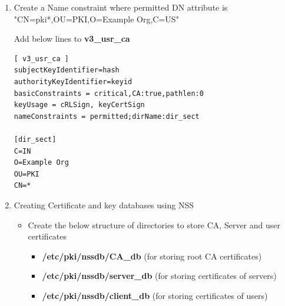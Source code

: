 \documentclass[a4paper]{article}
\begin{document}
\begin{enumerate}[label*=\arabic*.]
\begin{lstlisting}
[alt_names]
DNS.1 = *.example.org
       \end{lstlisting}

    \item Create a Name constraint where permitted DN attribute is "CN=pki*,OU=PKI,O=Example Org,C=US"

            Add below lines to \textbf{v3\_usr\_ca} 
            \begin{lstlisting}
[ v3_usr_ca ]
subjectKeyIdentifier=hash
authorityKeyIdentifier=keyid
basicConstraints = critical,CA:true,pathlen:0
keyUsage = cRLSign, keyCertSign
nameConstraints = permitted;dirName:dir_sect

[dir_sect]
C=IN
O=Example Org
OU=PKI
CN=*
            \end{lstlisting}
    \item Creating Certificate and key databases using NSS 
        \begin{itemize}
            \item Create the below structure of directories to store CA, Server and user certificates
                \begin{itemize}
                    \item \textbf{/etc/pki/nssdb/CA\_db} (for storing root CA certificates)
                    \item \textbf{/etc/pki/nssdb/server\_db} (for storing certificates of servers)
                    \item \textbf{/etc/pki/nssdb/client\_db} (for storing certificates of users)
                \end{itemize}
            

\end{itemize}
\end{enumerate}
\end{document}
